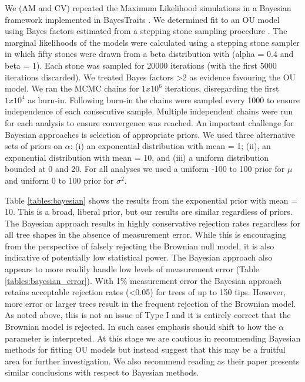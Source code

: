 \documentclass[a4paper,12pt]{article}
\begin{document}
\begin{enumerate}[(i)]
	    We (AM and CV) repeated the Maximum Likelihood simulations in a Bayesian framework implemented in BayesTraits \citep{pagel2013bayestraits}. 
      We determined fit to an OU model using Bayes factors estimated from a stepping stone sampling procedure \citep{xie2010improving}. 
      The marginal likelihoods of the models were calculated using a stepping stone sampler in which fifty stones were drawn from a beta distribution with (alpha = 0.4 and beta = 1). 
      Each stone was sampled for 20000 iterations (with the first 5000 iterations discarded). 
      We treated Bayes factors \textgreater 2 as evidence favouring the OU model. We ran the MCMC chains for $1x10^6$ iterations, disregarding the first $1x10^4$ as burn-in.
      Following burn-in the chains were sampled every 1000 to ensure independence of each consecutive sample. 
      Multiple independent chains were run for each analysis to ensure convergence was reached. 
      An important challenge for Bayesian approaches is selection of appropriate priors. We used three alternative sets of priors on $\alpha$: (i) an exponential distribution with mean = 1; (ii), an exponential distribution with mean = 10, and (iii) a uniform distribution bounded at 0 and 20. 
      For all analyses we used a uniform -100 to 100 prior for $\mu$ and uniform 0 to 100 prior for $\sigma^2$. 
      
      Table \ref{tables:bayesian} shows the results from the exponential prior with mean = 10. This is a broad, liberal prior, but our results are similar regardless of priors. %
      The Bayesian approach results in highly conservative rejection rates regardless for all tree shapes in the absence of measurement error. 
      While this is encouraging from the perspective of falsely rejecting the Brownian null model, it is also indicative of potentially low statistical power. 
      The Bayesian approach also appears to more readily handle low levels of measurement error (Table \ref{tables:bayesian_error}). 
      With 1\% measurement error the Bayesian approach retains acceptable rejection rates (\textless 0.05) for trees of up to 150 tips. 
      However, more error or larger trees result in the frequent rejection of the Brownian model. 
      As noted above, this is not an issue of Type I and it is entirely correct that the Brownian model is rejected. 
      In such cases emphasis should shift to how the $\alpha$ parameter is interpreted. 
      At this stage we are cautious in recommending Bayesian methods for fitting OU models but instead suggest that this may be a fruitful area for further investigation. 
      We also recommend reading \citet{pennell2015model} as their paper presents similar conclusions with respect to Bayesian methods.
    \end{enumerate}
\end{document}
